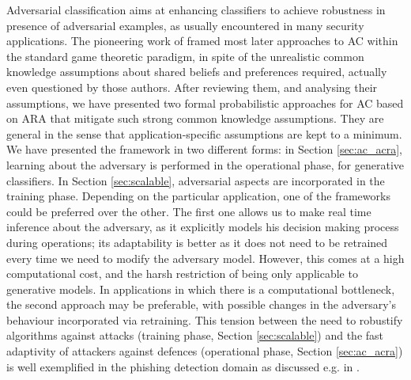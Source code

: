 Adversarial classification aims at enhancing classifiers to achieve robustness in presence of adversarial examples, as usually encountered in many security applications. The pioneering work of \cite{dalvi2004adversarial} framed most later approaches to AC 
within the standard game theoretic paradigm, in spite of the unrealistic common knowledge assumptions about shared beliefs and preferences required, actually even questioned by those authors. After reviewing them, and analysing  their assumptions, we have presented two formal probabilistic approaches for AC based on ARA that mitigate 
such strong common knowledge assumptions.
They are general in the sense that application-specific assumptions are kept to a minimum. 
%
We have presented the framework in two different forms: in Section \ref{sec:ac_acra}, learning about the adversary is performed in the
operational phase, for generative classifiers. In Section \ref{sec:scalable}, adversarial aspects are incorporated in the training phase. Depending on the particular application, one of the frameworks could be preferred over the other. The first one allows us to make real time inference about the adversary, as it explicitly models his decision making process during operations; its adaptability is better as it does not need to be retrained every time we need to modify the adversary model. However, this comes at a high computational cost, and the harsh restriction of being only applicable to generative models. In applications in which there is a computational bottleneck, the second approach may be preferable, with possible changes in the adversary's behaviour incorporated via retraining.
This tension between the need to robustify algorithms against attacks (training phase, Section  \ref{sec:scalable}) and the fast adaptivity of attackers against defences (operational phase, Section \ref{sec:ac_acra}) is well exemplified in the phishing detection domain as discussed e.g. in \parencite{rakesh}.

